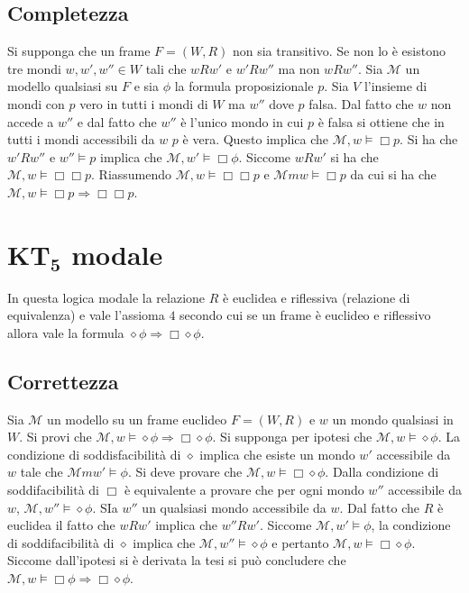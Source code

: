 \subsection{Completezza}
Si supponga che un frame $F=(W,R)$ non sia transitivo. Se non lo \`e esistono tre mondi $w, w',w''\in W$ tali che $wRw'$ e $w'Rw''$ ma non $wRw''$. Sia $\mathcal{M}$ un modello qualsiasi su $F$ e sia
$\phi$ la formula proposizionale $p$. Sia $V$ l'insieme di mondi con $p$ vero in tutti i mondi di $W$ ma $w''$ dove $p$ falsa. Dal fatto che $w$ non accede a $w''$ e dal fatto che $w''$ \`e l'unico mondo 
in cui $p$ \`e falsa si ottiene che in tutti i mondi accessibili da $w$ $p$ \`e vera. Questo implica che $\mathcal{M}, w\models\Box p$. Si ha che $w'Rw''$ e $w''\models p$ implica che $\mathcal{M}, 
w'\models\Box \phi$. Siccome $wRw'$ si ha che $\mathcal{M}, w\models\Box\Box p$. Riassumendo $\mathcal{M}, w\models\Box\Box p$ e $\mathcal{M}m w\models\Box p$ da cui si ha che $\mathcal{M},
w\models\Box p\Rightarrow\Box\Box p$.
\section{$\mathbf{KT_5}$ modale}
In questa logica modale la relazione $R$ \`e euclidea e riflessiva (relazione di equivalenza) e vale l'assioma $4$ secondo cui se un frame \`e euclideo e riflessivo allora vale la formula $\diamond\phi\Rightarrow
\Box\diamond\phi$.
\subsection{Correttezza}
Sia $\mathcal{M}$ un modello su un frame euclideo $F=(W, R)$ e $w$ un mondo qualsiasi in $W$. Si provi che $\mathcal{M}, w\models\diamond\phi\Rightarrow\Box\diamond\phi$. Si supponga per ipotesi
che $\mathcal{M}, w\models\diamond\phi$. La condizione di soddisfacibilit\`a di $\diamond$ implica che esiste un mondo $w'$ accessibile da $w$ tale che $\mathcal{M}m w'\models\phi$.  Si deve provare
che $\mathcal{M}, w\models\Box\diamond\phi$. Dalla condizione di soddifacibilit\`a di $\Box$ \`e equivalente a provare che per ogni mondo $w''$ accessibile da $w$, $\mathcal{M}, w''\models\diamond
\phi$. SIa $w''$ un qualsiasi mondo accessibile da $w$. Dal fatto che $R$ \`e euclidea il fatto che $wRw'$ implica che $w''Rw'$. Siccome $\mathcal{M}, w'\models\phi$, la condizione di soddifacibilit\`a di 
$\diamond$ implica che $\mathcal{M}, w''\models\diamond\phi$ e pertanto $\mathcal{M}, w\models\Box\diamond\phi$. Siccome dall'ipotesi si \`e derivata la tesi si pu\`o concludere che $\mathcal{M}, w
\models\Box\phi\Rightarrow\Box\diamond\phi$.
